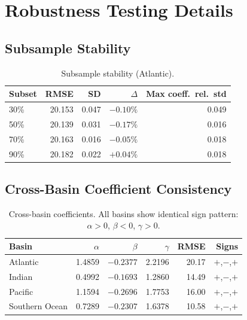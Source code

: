 \documentclass[12pt,a4paper]{article}
\begin{document}
\section{Robustness Testing Details}

\subsection{Subsample Stability}

\begin{table}[htbp]
\centering
\caption{Subsample stability (Atlantic).}
\begin{tabular}{lrrrr}
\toprule
\textbf{Subset} & RMSE & SD & $\Delta$ & Max coeff.\ rel.\ std \\
\midrule
30\% & 20.153 & 0.047 & $-0.10\%$ & 0.049 \\
50\% & 20.139 & 0.031 & $-0.17\%$ & 0.016 \\
70\% & 20.163 & 0.016 & $-0.05\%$ & 0.018 \\
90\% & 20.182 & 0.022 & $+0.04\%$ & 0.018 \\
\bottomrule
\end{tabular}
\end{table}

\subsection{Cross-Basin Coefficient Consistency}

\begin{table}[htbp]
\centering
\caption{Cross-basin coefficients. All basins show identical sign pattern: $\alpha > 0$, $\beta < 0$, $\gamma > 0$.}
\begin{tabular}{lrrrrr}
\toprule
\textbf{Basin} & $\alpha$ & $\beta$ & $\gamma$ & RMSE & Signs \\
\midrule
Atlantic        & 1.4859 & $-0.2377$ & 2.2196 & 20.17 & $+$,$-$,$+$ \\
Indian          & 0.4992 & $-0.1693$ & 1.2860 & 14.49 & $+$,$-$,$+$ \\
Pacific         & 1.1594 & $-0.2696$ & 1.7753 & 16.00 & $+$,$-$,$+$ \\
Southern Ocean  & 0.7289 & $-0.2307$ & 1.6378 & 10.58 & $+$,$-$,$+$ \\
\bottomrule
\end{tabular}
\end{table}

\end{document}
